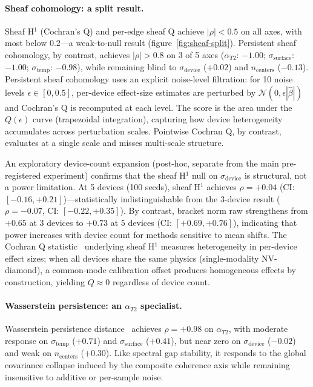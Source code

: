 \documentclass[11pt]{article}
\begin{document}
\paragraph{Sheaf cohomology: a split result.}
Sheaf H$^1$ (Cochran's Q) and per-edge sheaf Q achieve $|\rho| < 0.5$
on all axes, with most below $0.2$---a weak-to-null result
(figure~\ref{fig:sheaf-split}).
Persistent sheaf cohomology, by contrast, achieves
$|\rho| > 0.8$ on 3 of 5 axes ($\alpha_{T2}$: $-1.00$;
$\sigma_\text{surface}$: $-1.00$; $\sigma_\text{temp}$: $-0.98$),
while remaining blind to $\sigma_\text{device}$ ($+0.02$) and
$n_\text{centers}$ ($-0.13$).  Persistent sheaf cohomology uses an explicit noise-level
filtration: for 10 noise levels $\epsilon \in [0, 0.5]$, per-device
effect-size estimates are perturbed by $\mathcal{N}(0,
\epsilon|\hat\beta|)$ and Cochran's Q is recomputed at each level.
The score is the area under the $Q(\epsilon)$ curve (trapezoidal
integration), capturing how device heterogeneity accumulates across
perturbation scales.  Pointwise Cochran Q, by contrast, evaluates at a
single scale and misses multi-scale structure.

An exploratory device-count expansion (post-hoc, separate from the main
pre-registered experiment) confirms that the sheaf H$^1$ null on
$\sigma_\text{device}$ is structural, not a power limitation.
At 5 devices (100 seeds), sheaf H$^1$ achieves $\rho = +0.04$
(CI: $[-0.16, +0.21]$)---statistically indistinguishable from the
3-device result ($\rho = -0.07$, CI: $[-0.22, +0.35]$).  By
contrast, bracket norm raw strengthens from $+0.65$ at 3 devices
to $+0.73$ at 5 devices (CI: $[+0.69, +0.76]$), indicating that
power increases with device count for methods sensitive to mean
shifts.  The Cochran Q statistic~\citep{cochran1954combination} underlying sheaf
H$^1$ measures heterogeneity in per-device effect sizes; when all devices share
the same physics (single-modality NV-diamond), a common-mode
calibration offset produces homogeneous effects by construction,
yielding $Q \approx 0$ regardless of device count.

\paragraph{Wasserstein persistence: an $\alpha_{T2}$ specialist.}
Wasserstein persistence distance~\citep{villani2009optimal} achieves
$\rho = +0.98$ on $\alpha_{T2}$, with moderate response on
$\sigma_\text{temp}$ ($+0.71$) and $\sigma_\text{surface}$ ($+0.41$),
but near zero on $\sigma_\text{device}$ ($-0.02$) and weak on
$n_\text{centers}$ ($+0.30$).
Like spectral gap stability, it responds to the global covariance
collapse induced by the composite coherence axis while remaining
insensitive to additive or per-sample noise.
\end{document}
